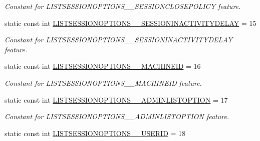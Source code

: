 \begin{DoxyCompactItemize}
\begin{DoxyCompactList}\small\item\em Constant for LISTSESSIONOPTIONS\_\-\_\-SESSIONCLOSEPOLICY feature. \item\end{DoxyCompactList}\item 
\hypertarget{classUMS__Data_1_1UMS__DataPackage_abe32fab9db44996b77b2c45baa843ae6}{
static const int \hyperlink{classUMS__Data_1_1UMS__DataPackage_abe32fab9db44996b77b2c45baa843ae6}{LISTSESSIONOPTIONS\_\-\_\-SESSIONINACTIVITYDELAY} = 15}
\label{classUMS__Data_1_1UMS__DataPackage_abe32fab9db44996b77b2c45baa843ae6}

\begin{DoxyCompactList}\small\item\em Constant for LISTSESSIONOPTIONS\_\-\_\-SESSIONINACTIVITYDELAY feature. \item\end{DoxyCompactList}\item 
\hypertarget{classUMS__Data_1_1UMS__DataPackage_a4162ee3abb7fd4af0f65f2ed41cbc575}{
static const int \hyperlink{classUMS__Data_1_1UMS__DataPackage_a4162ee3abb7fd4af0f65f2ed41cbc575}{LISTSESSIONOPTIONS\_\-\_\-MACHINEID} = 16}
\label{classUMS__Data_1_1UMS__DataPackage_a4162ee3abb7fd4af0f65f2ed41cbc575}

\begin{DoxyCompactList}\small\item\em Constant for LISTSESSIONOPTIONS\_\-\_\-MACHINEID feature. \item\end{DoxyCompactList}\item 
\hypertarget{classUMS__Data_1_1UMS__DataPackage_abf413a4095add5a6ac71cac1c20c5136}{
static const int \hyperlink{classUMS__Data_1_1UMS__DataPackage_abf413a4095add5a6ac71cac1c20c5136}{LISTSESSIONOPTIONS\_\-\_\-ADMINLISTOPTION} = 17}
\label{classUMS__Data_1_1UMS__DataPackage_abf413a4095add5a6ac71cac1c20c5136}

\begin{DoxyCompactList}\small\item\em Constant for LISTSESSIONOPTIONS\_\-\_\-ADMINLISTOPTION feature. \item\end{DoxyCompactList}\item 
\hypertarget{classUMS__Data_1_1UMS__DataPackage_a4f4dfd18f348603c71b123997329c860}{
static const int \hyperlink{classUMS__Data_1_1UMS__DataPackage_a4f4dfd18f348603c71b123997329c860}{LISTSESSIONOPTIONS\_\-\_\-USERID} = 18}
\label{classUMS__Data_1_1UMS__DataPackage_a4f4dfd18f348603c71b123997329c860}


\end{DoxyCompactItemize}

